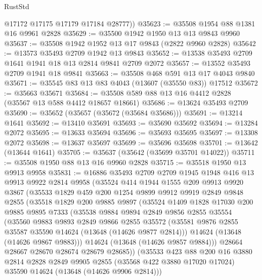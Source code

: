 \begin{lexlean}{RustStd}
\begin{coremodule}
        @17172
        @17175
        @17179
        @17184
        @28777))
@35623 := @35508 @1954 @88 @1381 @16 @9961 @2828
@35629 := @35500 @1942 @1950 @13 @13 @9843 @9960
@35637 := @35508 @1942 @1952 @13 @17 @9843 (@2822 @9960 @2828)
@35642 := @13573 @35493 @2709 @1942 @13 @9843
@35652 := @13538 @35493 @2709 @1641 @1941 @18 @13 @2814 @9841 @2709 @2072
@35657 := @13552 @35493 @2709 @1941 @18 @9841
@35663 := @35508 @468 @591 @13 @17 @4043 @9840
@35671 := @35545 @83 @13 @83 @4043 (@13607 (@35550 @83)) @17512
@35672 := @35663 @35671
@35684 := @35508 @589 @88 @13 @16 @4412 @2828 (@35567 @13 @588 @4412 @18657 @18661)
@35686 := @13624 @35493 @2709
@35690 := @35652 (@35657 (@35672 (@35684 @35686)))
@35691 := @13214 @1641
@35692 := @13410 @35691
@35693 := @35690 @35692
@35694 := @13284 @2072
@35695 := @13633 @35694
@35696 := @35693 @35695
@35697 := @13308 @2072
@35698 := @13637 @35697
@35699 := @35696 @35698
@35701 := @13642 (@13644 @1641)
@35705 := @35637 (@35642 (@35699 @35701 @14022))
@35711 := @35508 @1950 @88 @13 @16 @9960 @2828
@35715 := @35518 @1950 @13 @9913 @9958
@35831 := @16886
    @35493
    @2709
    @2709
    @1945
    @1948
    @416
    @13
    @9913
    @9922
    @2814
    @9958
    (@35524
      @414
      @1944
      @1555
      @209
      @9913
      @9920
      @3867
      (@35533
        @1829
        @459
        @200
        @1254
        @9899
        @9912
        @9919
        @2849
        @9848
        @2855
        (@35518
          @1829
          @200
          @9885
          @9897
          (@35524
            @1409
            @1828
            @17030
            @200
            @9885
            @9895
            @7333
            (@35538
              @9884
              @9894
              @2849
              @9856
              @2855
              @35554
              (@35560
                @9883
                @9893
                @2849
                @9866
                @2855
                @35572
                (@35581 @9876 @2855 @35587 @35590 @14624 (@13648 (@14626 @9877 @2814)))
                @14624
                (@13648 (@14626 @9867 @9883)))
              @14624
              (@13648 (@14626 @9857 @9884)))
            @28664
            @28667
            @28670
            @28674
            @28679
            @28685))
        (@35533
          @423
          @88
          @200
          @16
          @3880
          @2814
          @2828
          @2849
          @9905
          @2855
          (@35568 @422 @3880 @17020 @17024)
          @35590
          @14624
          (@13648 (@14626 @9906 @2814)))

\end{coremodule}
\end{lexlean}
